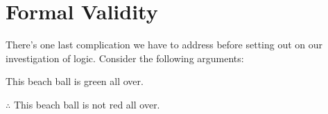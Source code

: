 %



\section{Formal Validity}\label{s:FormalValidity}

There's one last complication we have to address before setting out on our investigation of logic.  Consider the following arguments:

	\begin{earg}
		\item[\ex{exarg5}] This beach ball is green all over.
		\item[] $\therefore$ This beach ball is not red all over. 
	\end{earg}
	
